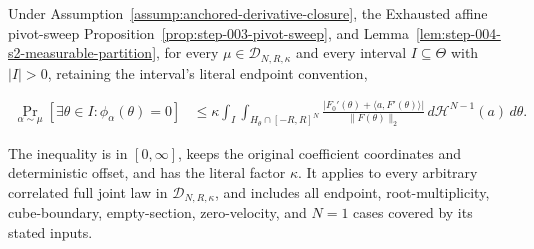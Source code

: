 \begin{proposition}
\label{prop:step-004-s2-affine-swept-area}

Under Assumption~\ref{assump:anchored-derivative-closure}, the Exhausted affine pivot-sweep
Proposition~\ref{prop:step-003-pivot-sweep}, and
Lemma~\ref{lem:step-004-s2-measurable-partition}, for every
\(\mu\in\mathcal D_{N,R,\kappa}\) and every interval \(I\subseteq\Theta\) with
\(\lvert I\rvert>0\), retaining the interval's literal endpoint convention,

\begin{equation}
\label{eq:appendix-display-141}
\begin{aligned}
\Pr_{\alpha\sim\mu}[\exists\theta\in I:\phi_\alpha(\theta)=0]
&\leq
\kappa\int_I\int_{H_\theta\cap[-R,R]^N}
\frac{\lvert F_0'(\theta)+\langle a,F'(\theta)\rangle\rvert}
{\lVert F(\theta)\rVert_2}
\,d\mathcal H^{N-1}(a)\,d\theta.
\end{aligned}
\end{equation}

The inequality is in \([0,\infty]\), keeps the original coefficient coordinates and deterministic offset,
and has the literal factor \(\kappa\). It applies to every arbitrary correlated full joint law in
\(\mathcal D_{N,R,\kappa}\), and includes all endpoint, root-multiplicity, cube-boundary, empty-section,
zero-velocity, and \(N=1\) cases covered by its stated inputs.


\end{proposition}

